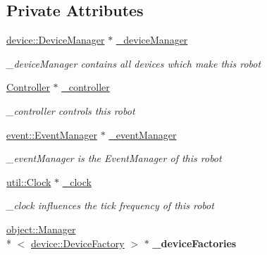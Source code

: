 \subsection*{Private Attributes}
\begin{DoxyCompactItemize}
\item 
\hypertarget{classdrobot_1_1robot_1_1Robot_a21feadb9760c4483c4e88706d6c21052}{\hyperlink{classdrobot_1_1device_1_1DeviceManager}{device\-::\-Device\-Manager} $\ast$ \hyperlink{classdrobot_1_1robot_1_1Robot_a21feadb9760c4483c4e88706d6c21052}{\-\_\-device\-Manager}}\label{classdrobot_1_1robot_1_1Robot_a21feadb9760c4483c4e88706d6c21052}

\begin{DoxyCompactList}\small\item\em \-\_\-device\-Manager contains all devices which make this robot \end{DoxyCompactList}\item 
\hypertarget{classdrobot_1_1robot_1_1Robot_acdbce791007a5d7d0a35ed13c5f5950b}{\hyperlink{classdrobot_1_1robot_1_1Controller}{Controller} $\ast$ \hyperlink{classdrobot_1_1robot_1_1Robot_acdbce791007a5d7d0a35ed13c5f5950b}{\-\_\-controller}}\label{classdrobot_1_1robot_1_1Robot_acdbce791007a5d7d0a35ed13c5f5950b}

\begin{DoxyCompactList}\small\item\em \-\_\-controller controls this robot \end{DoxyCompactList}\item 
\hypertarget{classdrobot_1_1robot_1_1Robot_aae3d485a38a1fe25c5d728acca1c4872}{\hyperlink{classdrobot_1_1event_1_1EventManager}{event\-::\-Event\-Manager} $\ast$ \hyperlink{classdrobot_1_1robot_1_1Robot_aae3d485a38a1fe25c5d728acca1c4872}{\-\_\-event\-Manager}}\label{classdrobot_1_1robot_1_1Robot_aae3d485a38a1fe25c5d728acca1c4872}

\begin{DoxyCompactList}\small\item\em \-\_\-event\-Manager is the Event\-Manager of this robot \end{DoxyCompactList}\item 
\hypertarget{classdrobot_1_1robot_1_1Robot_aa748836d5d91238cabd029bec61eaa99}{\hyperlink{classdrobot_1_1util_1_1Clock}{util\-::\-Clock} $\ast$ \hyperlink{classdrobot_1_1robot_1_1Robot_aa748836d5d91238cabd029bec61eaa99}{\-\_\-clock}}\label{classdrobot_1_1robot_1_1Robot_aa748836d5d91238cabd029bec61eaa99}

\begin{DoxyCompactList}\small\item\em \-\_\-clock influences the tick frequency of this robot \end{DoxyCompactList}\item 
\hypertarget{classdrobot_1_1robot_1_1Robot_a3e0c4c3a8167c6da4c86b8d506119d1c}{\hyperlink{classdrobot_1_1object_1_1Manager}{object\-::\-Manager}\\*
$<$ \hyperlink{classdrobot_1_1device_1_1DeviceFactory}{device\-::\-Device\-Factory} $>$ $\ast$ {\bfseries \-\_\-device\-Factories}}\label{classdrobot_1_1robot_1_1Robot_a3e0c4c3a8167c6da4c86b8d506119d1c}

\end{DoxyCompactItemize}
